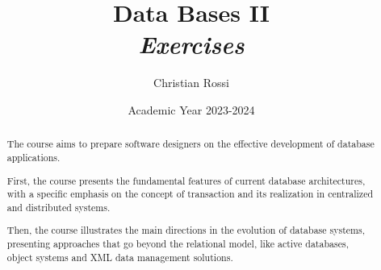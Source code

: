 \documentclass[12pt, a4paper]{report}
\title{Data Bases II \\ \textit{Exercises}}
\author{Christian Rossi}
\date{Academic Year 2023-2024}
\newtheorem[style=M,bodystyle=\normalfont]{theorem}{Theorem}
\newtheorem[style=M,bodystyle=\normalfont]{corollary}{Corollary}
\newtheorem[style=M,bodystyle=\normalfont]{lemma}{Lemma}
\newtheorem[style=M,bodystyle=\normalfont]{definition}{Definition}
\begin{document}
\maketitle

\newpage

\begin{abstract}
    The course aims to prepare software designers on the effective development of database applications. 
    
    First, the course presents the fundamental features of current database architectures, with a specific emphasis on the concept of transaction and its realization in centralized 
    and distributed systems. 
    
    Then, the course illustrates the main directions in the evolution of database systems, presenting approaches that go beyond the relational model, like active databases, object 
    systems and XML data management solutions.
\end{abstract}

\newpage

\tableofcontents

\newpage
\end{document}
